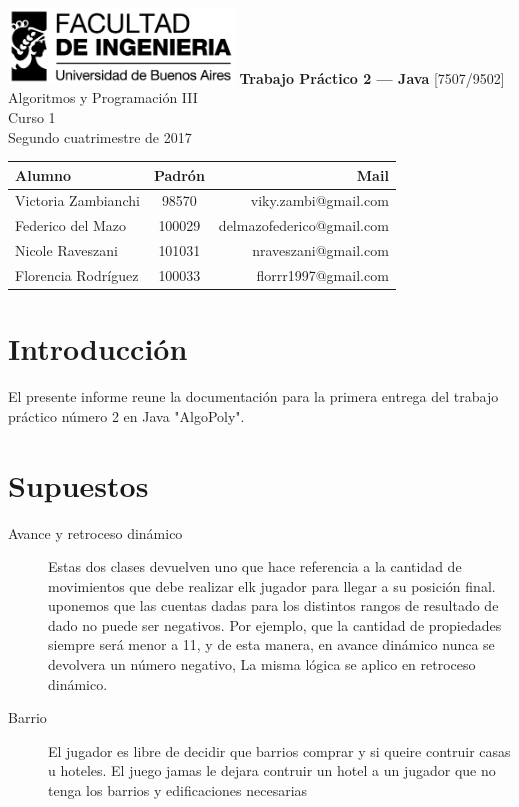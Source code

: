 \documentclass[titlepage,a4paper]{article}
\begin{document}
\begin{titlepage} %
	\hfill\includegraphics[width=6cm]{fiuba.jpg}
    \centering
    \vfill
    \Huge \textbf{Trabajo Práctico 2 — Java}
    \vskip2cm
    \Large [7507/9502] Algoritmos y Programación III\\
    Curso 1 \\ %
    Segundo cuatrimestre de 2017 
    \vfill
    \begin{tabular}{|l|c|r|}
	\hline
    Alumno & Padrón & Mail\\
	\hline
	Victoria Zambianchi & 98570 & viky.zambi@gmail.com\\
	\hline
    Federico del Mazo & 100029 & delmazofederico@gmail.com\\
	\hline
    Nicole Raveszani & 101031 & nraveszani@gmail.com\\
	\hline
    Florencia Rodríguez & 100033 & florrr1997@gmail.com\\
	\hline
	\end{tabular}
    \vfill
    \vfill
    
    
\end{titlepage}

\tableofcontents %
\newpage

\section{Introducción}\label{sec:intro}
El presente informe reune la documentación para la primera entrega del trabajo práctico número 2 en Java "AlgoPoly".

\section{Supuestos}\label{sec:supuestos}
\begin{description}
\item[Avance y retroceso dinámico] Estas dos clases devuelven uno que hace referencia a la cantidad de movimientos que debe realizar elk jugador para llegar a su posición final. uponemos que las  cuentas dadas para los distintos rangos de resultado de dado no puede ser negativos. Por ejemplo, que la cantidad de propiedades siempre será menor a 11, y de esta manera, en avance dinámico nunca se devolvera un número negativo, La misma lógica se aplico en retroceso dinámico.
\item[Barrio] El jugador es libre de decidir que barrios comprar y si queire contruir casas u hoteles. El juego jamas le dejara contruir un hotel a un jugador que no tenga los barrios y edificaciones necesarias


\end{description}
\end{document}
